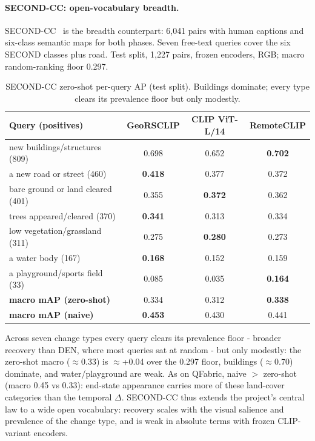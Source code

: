 \documentclass{article}
\begin{document}
\paragraph{SECOND-CC: open-vocabulary breadth.}
SECOND-CC~\cite{secondcc} is the breadth counterpart: 6{,}041 pairs with human
captions and six-class semantic maps for both phases. Seven free-text queries
cover the six SECOND classes plus road. Test split, 1{,}227 pairs, frozen
encoders, RGB; macro random-ranking floor 0.297.

\begin{table}[H]
    \centering
    \caption{SECOND-CC zero-shot per-query AP (test split). Buildings dominate;
    every type clears its prevalence floor but only modestly.}
    \label{tab:secondcc}
    \begin{tabular}{lccc}
        \toprule
        \textbf{Query (positives)} & \textbf{GeoRSCLIP} & \textbf{CLIP ViT-L/14} & \textbf{RemoteCLIP} \\
        \midrule
        new buildings/structures (809) & 0.698 & 0.652 & \textbf{0.702} \\
        a new road or street (460)     & \textbf{0.418} & 0.377 & 0.372 \\
        bare ground or land cleared (401) & 0.355 & \textbf{0.372} & 0.362 \\
        trees appeared/cleared (370)   & \textbf{0.341} & 0.313 & 0.334 \\
        low vegetation/grassland (311) & 0.275 & \textbf{0.280} & 0.273 \\
        a water body (167)             & \textbf{0.168} & 0.152 & 0.159 \\
        a playground/sports field (33) & 0.085 & 0.035 & \textbf{0.164} \\
        \midrule
        \textbf{macro mAP (zero-shot)} & 0.334 & 0.312 & \textbf{0.338} \\
        \textbf{macro mAP (naive)}     & \textbf{0.453} & 0.430 & 0.441 \\
        \bottomrule
    \end{tabular}
\end{table}

Across seven change types every query clears its prevalence floor - broader
recovery than DEN, where most queries sat at random - but only modestly: the
zero-shot macro ($\approx$0.33) is $\approx$+0.04 over the 0.297 floor, buildings
($\approx$0.70) dominate, and water/playground are weak. As on QFabric, naive
$>$ zero-shot (macro 0.45 vs 0.33): end-state appearance carries more of these
land-cover categories than the temporal $\Delta$. SECOND-CC thus extends the
project's central law to a wide open vocabulary: recovery scales with the visual
salience and prevalence of the change type, and is weak in absolute terms with
frozen CLIP-variant encoders.
\end{document}
